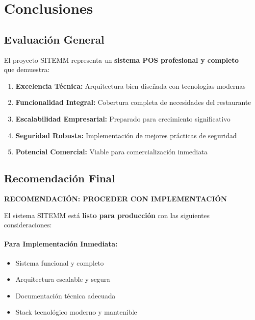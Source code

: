 \documentclass[12pt,a4paper]{article}
\begin{document}
\section{Conclusiones}

\subsection{Evaluación General}

El proyecto SITEMM representa un \textbf{sistema POS profesional y completo} que demuestra:

\begin{enumerate}
    \item \textcolor{primaryblue}{\textbf{Excelencia Técnica:}} Arquitectura bien diseñada con tecnologías modernas
    \item \textcolor{primaryblue}{\textbf{Funcionalidad Integral:}} Cobertura completa de necesidades del restaurante
    \item \textcolor{primaryblue}{\textbf{Escalabilidad Empresarial:}} Preparado para crecimiento significativo
    \item \textcolor{primaryblue}{\textbf{Seguridad Robusta:}} Implementación de mejores prácticas de seguridad
    \item \textcolor{primaryblue}{\textbf{Potencial Comercial:}} Viable para comercialización inmediata
\end{enumerate}

\subsection{Recomendación Final}

\textcolor{secondarygreen}{\textbf{RECOMENDACIÓN: PROCEDER CON IMPLEMENTACIÓN}}

El sistema SITEMM está \textbf{listo para producción} con las siguientes consideraciones:

\paragraph{Para Implementación Inmediata:}
\begin{itemize}
    \item Sistema funcional y completo
    \item Arquitectura escalable y segura
    \item Documentación técnica adecuada
    \item Stack tecnológico moderno y mantenible
\end{itemize}
\end{document}
